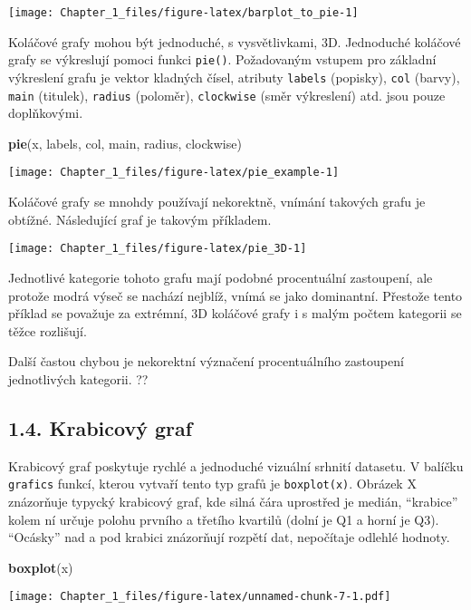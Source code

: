 \documentclass[]{article}
\newenvironment{Shaded}{\begin{snugshade}}{\end{snugshade}}
\newcommand{\KeywordTok}[1]{\textcolor[rgb]{0.13,0.29,0.53}{\textbf{#1}}}
\newcommand{\NormalTok}[1]{#1}
\theoremstyle{definition}
\theoremstyle{definition}
\theoremstyle{remark}
\begin{document}
\begin{center}\texttt{[image: Chapter\_1\_files/figure-latex/barplot\_to\_pie-1]} \end{center}

Koláčové grafy mohou být jednoduché, s vysvětlivkami, 3D. Jednoduché
koláčové grafy se výkreslují pomoci funkci \texttt{pie()}. Požadovaným
vstupem pro základní výkreslení grafu je vektor kladných čísel, atributy
\texttt{labels} (popisky), \texttt{col} (barvy), \texttt{main}
(titulek), \texttt{radius} (poloměr), \texttt{clockwise} (směr
výkreslení) atd. jsou pouze doplňkovými.

\begin{Shaded}
\begin{Highlighting}[]
\KeywordTok{pie}\NormalTok{(x, labels, col, main, radius, clockwise)}
\end{Highlighting}
\end{Shaded}

\begin{center}\texttt{[image: Chapter\_1\_files/figure-latex/pie\_example-1]} \end{center}

Koláčové grafy se mnohdy používají nekorektně, vnímání takových grafu je
obtížné. Následující graf je takovým příkladem.

\begin{center}\texttt{[image: Chapter\_1\_files/figure-latex/pie\_3D-1]} \end{center}

Jednotlivé kategorie tohoto grafu mají podobné procentuální zastoupení,
ale protože modrá výseč se nachází nejblíž, vnímá se jako dominantní.
Přestože tento příklad se považuje za extrémní, 3D koláčové grafy i s
malým počtem kategorii se těžce rozlišují.

Další častou chybou je nekorektní význačení procentuálního zastoupení
jednotlivých kategorii. ??

\subsection{1.4. Krabicový graf}\label{krabicovy-graf}

Krabicový graf poskytuje rychlé a jednoduché vizuální srhnití datasetu.
V balíčku \texttt{grafics} funkcí, kterou vytvaří tento typ grafů je
\texttt{boxplot(x)}. Obrázek X znázorňuje typycký krabicový graf, kde
silná čára uprostřed je medián, ``krabice'' kolem ní určuje polohu
prvního a třetího kvartilů (dolní je Q1 a horní je Q3). ``Ocásky'' nad a
pod krabici znázorňují rozpětí dat, nepočítaje odlehlé hodnoty.

\begin{Shaded}
\begin{Highlighting}[]
\KeywordTok{boxplot}\NormalTok{(x)}
\end{Highlighting}
\end{Shaded}

\texttt{[image: Chapter\_1\_files/figure-latex/unnamed-chunk-7-1.pdf]}
\end{document}
